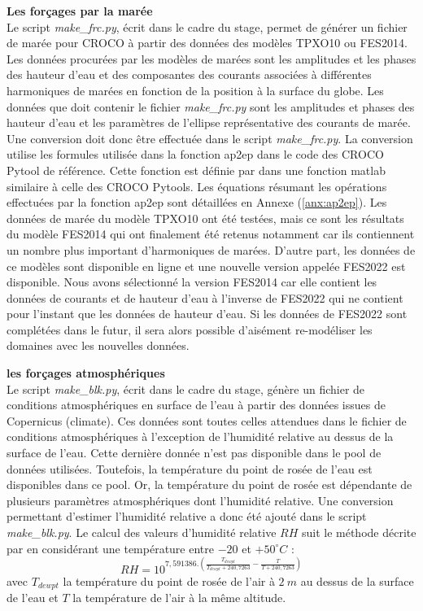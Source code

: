 \documentclass[10pt,a4paper,titlepage]{article}
\begin{document}
\textbf{Les forçages par la marée}\\
\label{par:forcages_marree}
Le script \textit{make\_frc.py}, écrit dans le cadre du stage, permet de générer un fichier de marée pour CROCO à partir des données des modèles TPXO10 ou FES2014.
Les données procurées par les modèles de marées sont les amplitudes et les phases des hauteur d'eau et des composantes des courants associées à différentes harmoniques de marées en fonction de la position à la surface du globe.
Les données que doit contenir le fichier \textit{make\_frc.py} sont les amplitudes et phases des hauteur d'eau et les paramètres de l'ellipse représentative des courants de marée.
Une conversion doit donc être effectuée dans le script \textit{make\_frc.py}.
La conversion utilise les formules utilisée dans la fonction ap2ep dans le code des CROCO Pytool de référence.
Cette fonction est définie par \cite[Zhigang Xu (2002)][]{ap2ep} dans une fonction matlab similaire à celle des CROCO Pytools.
Les équations résumant les opérations effectuées par la fonction ap2ep sont détaillées en Annexe (\ref{anx:ap2ep}).
Les données de marée du modèle TPXO10 ont été testées, mais ce sont les résultats du modèle FES2014 qui ont finalement été retenus notamment car ils contiennent un nombre plus important d'harmoniques de marées.
D'autre part, les données de ce modèles sont disponible en ligne et une nouvelle version appelée FES2022 est disponible.
Nous avons sélectionné la version FES2014 car elle contient les données de courants et de hauteur d'eau à l'inverse de FES2022 qui ne contient pour l'instant que les données de hauteur d'eau.
Si les données de FES2022 sont complétées dans le futur, il sera alors possible d'aisément re-modéliser les domaines avec les nouvelles données.

\textbf{les forçages atmosphériques}\\
\label{par:forcages_atm}
Le script \textit{make\_blk.py}, écrit dans le cadre du stage, génère un fichier de conditions atmosphériques en surface de l'eau à partir des données issues de Copernicus (climate).
Ces données sont toutes celles attendues dans le fichier de conditions atmosphériques à l'exception de l'humidité relative au dessus de la surface de l'eau. Cette dernière donnée n'est pas disponible dans le pool de données utilisées.
Toutefois, la température du point de rosée de l'eau est disponibles dans ce pool.
Or, la température du point de rosée est dépendante de plusieurs paramètres atmosphériques dont l'humidité relative.
Une conversion permettant d'estimer l'humidité relative a donc été ajouté dans le script \textit{make\_blk.py}.
Le calcul des valeurs d'humidité relative $RH$ suit le méthode décrite par \cite{humidity_formulation} en considérant une température entre $-20$ et $+50 ^\circ C$ :
$$RH = 10^{7,591386.(\frac{T_{dewpt}}{T_{dewpt}+240,7263}-\frac{T}{T+240,7263})}$$
avec $T_{dewpt}$ la température du point de rosée de l'air à $2~m$ au dessus de la surface de l'eau et $T$ la température de l'air à la même altitude.
\end{document}
